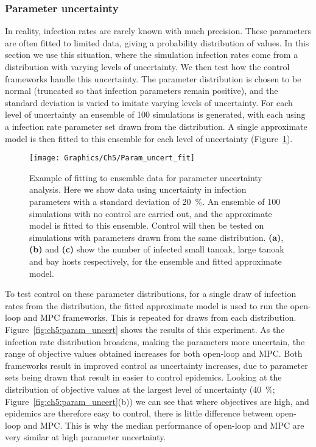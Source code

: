 \subsubsection{Parameter uncertainty}

In reality, infection rates are rarely known with much precision. These parameters are often fitted to limited data, giving a probability distribution of values. In this section we use this situation, where the simulation infection rates come from a distribution with varying levels of uncertainty. We then test how the control frameworks handle this uncertainty. The parameter distribution is chosen to be normal (truncated so that infection parameters remain positive), and the standard deviation is varied to imitate varying levels of uncertainty. For each level of uncertainty an ensemble of 100 simulations is generated, with each using a infection rate parameter set drawn from the distribution. A single approximate model is then fitted to this ensemble for each level of uncertainty (Figure~\ref{fig:ch5:param_uncert_fit}).

\begin{figure}
    \begin{center}
        \texttt{[image: Graphics/Ch5/Param\_uncert\_fit]}
        \caption[Ensemble fitting under parameter uncertainty]{Example of fitting to ensemble data for parameter uncertainty analysis. Here we show data using uncertainty in infection parameters with a standard deviation of \SI{20}{\percent}. An ensemble of 100 simulations with no control are carried out, and the approximate model is fitted to this ensemble. Control will then be tested on simulations with parameters drawn from the same distribution. \textbf{(a)}, \textbf{(b)} and \textbf{(c)} show the number of infected small tanoak, large tanoak and bay hosts respectively, for the ensemble and fitted approximate model.\label{fig:ch5:param_uncert_fit}}
    \end{center}
\end{figure}

To test control on these parameter distributions, for a single draw of infection rates from the distribution, the fitted approximate model is used to run the open-loop and MPC frameworks. This is repeated for  draws from each distribution. Figure~\ref{fig:ch5:param_uncert} shows the results of this experiment. As the infection rate distribution broadens, making the parameters more uncertain, the range of objective values obtained increases for both open-loop and MPC\@. Both frameworks result in improved control as uncertainty increases, due to parameter sets being drawn that result in easier to control epidemics. Looking at the distribution of objective values at the largest level of uncertainty (\SI{40}{\percent}; Figure~\ref{fig:ch5:param_uncert}(b)) we can see that where objectives are high, and epidemics are therefore easy to control, there is little difference between open-loop and MPC\@. This is why the median performance of open-loop and MPC are very similar at high parameter uncertainty.

